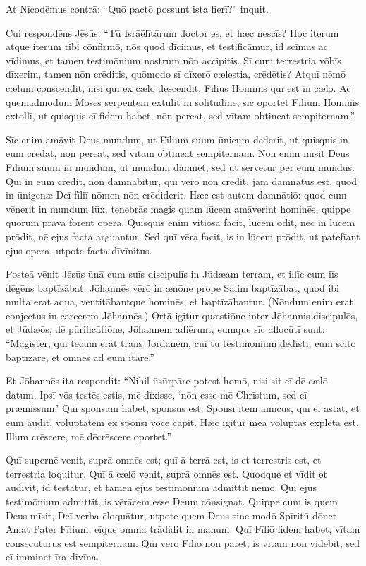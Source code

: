 \Versus At Nīcodēmus contrā: ``Quō pactō possunt ista fierī?'' inquit.

\Versus Cui respondēns Jēsūs: ``Tū Isrāēlītārum doctor es, et hæc nescīs?
\Versus Hoc iterum atque iterum tibi cōnfirmō, nōs quod dīcimus, et testificāmur, id scīmus ac vīdimus, et tamen testimōnium nostrum nōn accipitis.
\Versus Sī cum terrestria vōbīs dīxerim, tamen nōn crēditis, quōmodo sī dīxerō cælestia, crēdētis?
\Versus Atquī nēmō cælum cōnscendit, nisi quī ex cælō dēscendit, Fīlius Hominis quī est in cælō.
\Versus Ac quemadmodum Mōsēs serpentem extulit in sōlitūdine, sīc oportet Fīlium Hominis extollī,
\Versus ut quisquis eī fidem habet, nōn pereat, sed vītam obtineat sempiternam.''

\Versus Sīc enim amāvit Deus mundum, ut Fīlium suum ūnicum dederit, ut quisquis in eum crēdat, nōn pereat, sed vītam obtineat sempiternam.
\Versus Nōn enim mīsit Deus Fīlium suum in mundum, ut mundum damnet, sed ut servētur per eum mundus.
\Versus Quī in eum crēdit, nōn damnābitur, quī vērō nōn crēdit, jam damnātus est, quod in ūnigenæ Deī fīliī nōmen nōn crēdiderit.
\Versus Hæc est autem damnātiō: quod cum vēnerit in mundum lūx, tenebrās magis quam lūcem amāverint hominēs, quippe quōrum prāva forent opera.
\Versus Quisquis enim vitiōsa facit, lūcem ōdit, nec in lūcem prōdit, nē ejus facta arguantur.
\Versus Sed quī vēra facit, is in lūcem prōdit, ut patefīant ejus opera, utpote facta dīvīnitus.

\Versus Posteā vēnit Jēsūs ūnā cum suīs discipulīs in Jūdæam terram, et illīc cum iīs dēgēns baptīzābat.
\Versus Jōhannēs vērō in ænōne prope Salim baptīzābat, quod ibi multa erat aqua, ventitābantque hominēs, et baptīzābantur.
\Versus (Nōndum enim erat conjectus in carcerem Jōhannēs.)
\Versus Ortā igitur quæstiōne inter Jōhannis discipulōs, et Jūdæōs, dē pūrificātiōne,
\Versus Jōhannem adiērunt, eumque sīc allocūtī sunt: ``Magister, quī tēcum erat trāns Jordānem, cui tū testimōnium dedistī, eum scītō baptīzāre, et omnēs ad eum itāre.''

\Versus Et Jōhannēs ita respondit: ``Nihil ūsūrpāre potest homō, nisi sit eī dē cælō datum.
\Versus Ipsī vōs testēs estis, mē dīxisse, `nōn esse mē Chrīstum, sed eī præmissum.'
\Versus Quī spōnsam habet, spōnsus est. Spōnsī item amīcus, quī eī astat, et eum audit, voluptātem ex spōnsī vōce capit. Hæc igitur mea voluptās explēta est.
\Versus Illum crēscere, mē dēcrēscere oportet.''

\Versus Quī supernē venit, suprā omnēs est; quī ā terrā est, is et terrestris est, et terrestria loquitur. Quī ā cælō venit, suprā omnēs est.
\Versus Quodque et vīdit et audīvit, id testātur, et tamen ejus testimōnium admittit nēmō.
\Versus Quī ejus testimōnium admittit, is vērācem esse Deum cōnsignat.
\Versus Quippe cum is quem Deus mīsit, Deī verba ēloquātur, utpote quem Deus sine modō Spīritū dōnet.
\Versus Amat Pater Fīlium, eīque omnia trādidit in manum.
\Versus Quī Fīliō fidem habet, vītam cōnsecūtūrus est sempiternam. Quī vērō Fīliō nōn pāret, is vītam nōn vidēbit, sed eī imminet īra dīvīna.



